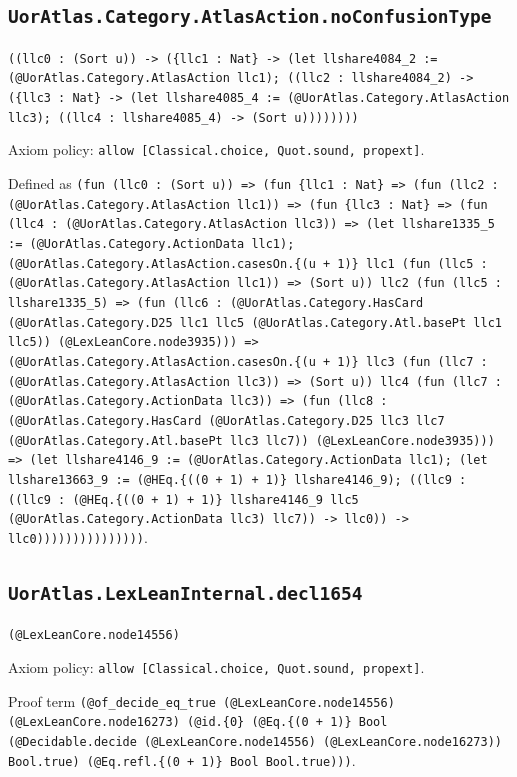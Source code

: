 \documentclass[11pt]{article}
\begin{document}
\subsection*{\texttt{UorAtlas.Category.AtlasAction.noConfusionType}}
\noindent\texttt{((llc0 : (Sort u)) -> (\{llc1 : Nat\} -> (let llshare4084\_2 := (@UorAtlas.Category.AtlasAction llc1); ((llc2 : llshare4084\_2) -> (\{llc3 : Nat\} -> (let llshare4085\_4 := (@UorAtlas.Category.AtlasAction llc3); ((llc4 : llshare4085\_4) -> (Sort u))))))))}\par
\noindent Axiom policy: \texttt{allow [Classical.choice, Quot.sound, propext]}.\par
\noindent Defined as \texttt{(fun (llc0 : (Sort u)) => (fun \{llc1 : Nat\} => (fun (llc2 : (@UorAtlas.Category.AtlasAction llc1)) => (fun \{llc3 : Nat\} => (fun (llc4 : (@UorAtlas.Category.AtlasAction llc3)) => (let llshare1335\_5 := (@UorAtlas.Category.ActionData llc1); (@UorAtlas.Category.AtlasAction.casesOn.\{(u + 1)\} llc1 (fun (llc5 : (@UorAtlas.Category.AtlasAction llc1)) => (Sort u)) llc2 (fun (llc5 : llshare1335\_5) => (fun (llc6 : (@UorAtlas.Category.HasCard (@UorAtlas.Category.D25 llc1 llc5 (@UorAtlas.Category.Atl.basePt llc1 llc5)) (@LexLeanCore.node3935))) => (@UorAtlas.Category.AtlasAction.casesOn.\{(u + 1)\} llc3 (fun (llc7 : (@UorAtlas.Category.AtlasAction llc3)) => (Sort u)) llc4 (fun (llc7 : (@UorAtlas.Category.ActionData llc3)) => (fun (llc8 : (@UorAtlas.Category.HasCard (@UorAtlas.Category.D25 llc3 llc7 (@UorAtlas.Category.Atl.basePt llc3 llc7)) (@LexLeanCore.node3935))) => (let llshare4146\_9 := (@UorAtlas.Category.ActionData llc1); (let llshare13663\_9 := (@HEq.\{((0 + 1) + 1)\} llshare4146\_9); ((llc9 : ((llc9 : (@HEq.\{((0 + 1) + 1)\} llshare4146\_9 llc5 (@UorAtlas.Category.ActionData llc3) llc7)) -> llc0)) -> llc0)))))))))))))))}.\par
\subsection*{\texttt{UorAtlas.LexLeanInternal.decl1654}}
\noindent\texttt{(@LexLeanCore.node14556)}\par
\noindent Axiom policy: \texttt{allow [Classical.choice, Quot.sound, propext]}.\par
\noindent Proof term \texttt{(@of\_decide\_eq\_true (@LexLeanCore.node14556) (@LexLeanCore.node16273) (@id.\{0\} (@Eq.\{(0 + 1)\} Bool (@Decidable.decide (@LexLeanCore.node14556) (@LexLeanCore.node16273)) Bool.true) (@Eq.refl.\{(0 + 1)\} Bool Bool.true)))}.\par
\end{document}
